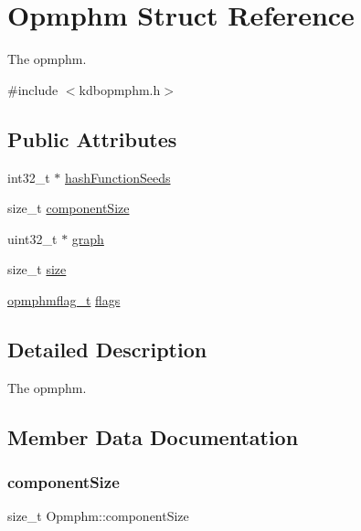 \hypertarget{structOpmphm}{}\section{Opmphm Struct Reference}
\label{structOpmphm}


The opmphm.  




{\ttfamily \#include $<$kdbopmphm.\+h$>$}

\subsection*{Public Attributes}
\begin{DoxyCompactItemize}
\item 
int32\+\_\+t $\ast$ \mbox{\hyperlink{structOpmphm_a522b3ab16ceb22828b54333868c9324d}{hash\+Function\+Seeds}}
\item 
size\+\_\+t \mbox{\hyperlink{structOpmphm_a01441fc04bd56fd6253ca4265364d39c}{component\+Size}}
\item 
uint32\+\_\+t $\ast$ \mbox{\hyperlink{structOpmphm_a9346a5fabe0c3a96abd70bb18cbd7fa2}{graph}}
\item 
size\+\_\+t \mbox{\hyperlink{structOpmphm_a72e7343b4ea87b27891e760f03fd2b96}{size}}
\item 
\mbox{\hyperlink{kdbopmphm_8h_a2485eafcb5c3e235f15e91d98ec39eef}{opmphmflag\+\_\+t}} \mbox{\hyperlink{structOpmphm_af321bfb7ed0bd9fc2c62a4b07568e3c6}{flags}}
\end{DoxyCompactItemize}


\subsection{Detailed Description}
The opmphm. 

\subsection{Member Data Documentation}
\mbox{\label{structOpmphm_a01441fc04bd56fd6253ca4265364d39c}} 
\subsubsection{\texorpdfstring{componentSize}{componentSize}}
{\footnotesize\ttfamily size\+\_\+t Opmphm\+::component\+Size}

